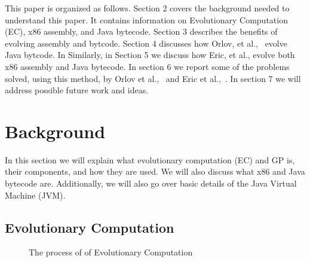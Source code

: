 \documentclass{sig-alternate}
\begin{document}
This paper is organized as follows. Section 2 covers the background needed to understand this paper. It contains information on Evolutionary Computation (EC), x86 assembly, and Java bytecode. Section 3 describes the benefits of evolving assembly and bytcode. Section 4 discusses how Orlov, et al.,~\cite{FINCH:2011} evolve Java bytcode. In Similarly, in Section 5 we discuss how Eric, et al., evolve both x86 assembly and Java bytecode. In section 6 we report some of the problems solved, using this method, by Orlov et al.,~\cite{FINCH:2011} and Eric et al.,~\cite{Assembly:2010}. In section 7 we will address possible future work and ideas.
	
	

\section{Background}


In this section we will explain what evolutionary computation (EC) and GP is, their components, and how they are used. We will also discuss what x86 and Java bytecode are. Additionally, we will also go over basic details of the Java Virtual Machine (JVM).
\subsection{Evolutionary Computation}
\begin{figure}
\centering
{}

\caption{The process of of Evolutionary Computation}
\label{ECdiagram}
\end{figure}
\end{document}
